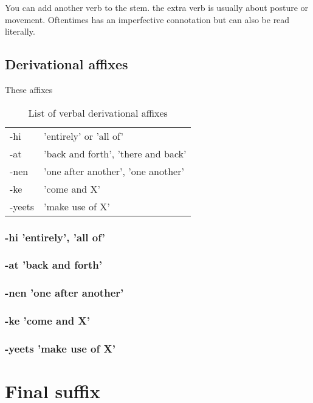 \documentclass[smallroyalvopaper,9pt]{memoir}
\begin{document}
You can add another verb to the stem. the extra verb is usually about posture or movement. Oftentimes has an imperfective connotation but can also be read literally.

\subsection{Derivational affixes}

These affixes 

\begin{table}[ht]
    \centering
    \begin{tabular}{ll}
        \toprule
        -hi & 'entirely' or 'all of' \\
        -at & 'back and forth', 'there and back' \\
        -nen & 'one after another', 'one another' \\
        -ke & 'come and X' \\
        -yeets & 'make use of X' \\
        \bottomrule
    \end{tabular}
    \caption{List of verbal derivational affixes}
\end{table}

\subsubsection{-hi 'entirely', 'all of'}

\subsubsection{-at 'back and forth'}

\subsubsection{-nen 'one after another'}

\subsubsection{-ke 'come and X'}

\subsubsection{-yeets 'make use of X'}

\section{Final suffix}
\end{document}
